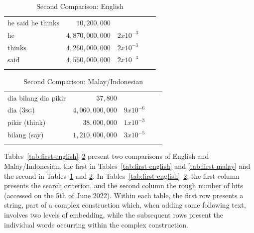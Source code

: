 \documentclass[output=paper,colorlinks,citecolor=brown
]{langscibook}
\begin{document}
\begin{table}
\caption{Second Comparison: English}
\label{tab:second-english}
 \begin{tabularx}{.8\textwidth}{X rrrr}
 \lsptoprule
 he said he thinks & $10,200,000$ & {} \\
 he & $4,870,000,000$ & $2 x 10^{-3}$ \\
 thinks & $4,260,000,000$ & $2 x 10^{-3}$\\
 said & $4,560,000,000$ & $2 x 10^{-3}$\\
 \lspbottomrule
 \end{tabularx}
\end{table}

\begin{table}
\caption{Second Comparison: Malay/Indonesian}
\label{tab:second-malay}
 \begin{tabularx}{.8\textwidth}{X rrrr}
 \lsptoprule
 dia bilang dia pikir & $37,800$ & {} \\
 dia (3\textsc{sg}) & $4,060,000,000$ & $9 x 10^{-6}$ \\
 pikir (think) & $38,000,000$ & $1 x 10^{-3}$\\
 bilang (say) & $1,210,000,000$ & $3 x 10^{-5}$\\
 \lspbottomrule
 \end{tabularx}
\end{table}

Tables~\ref{tab:first-english}--\ref{tab:second-malay} present two comparisons of English and Malay/Indonesian, the first in Tables~\ref{tab:first-english} and \ref{tab:first-malay} and the second in Tables~\ref{tab:second-english} and \ref{tab:second-malay}.  In Tables~\ref{tab:first-english}--\ref{tab:second-malay}, the first column presents the search criterion, and the second column the rough number of hits (accessed on the 5th of June 2022).  Within each table, the first row presents a string, part of a complex construction which, when adding some following text, involves two levels of embedding, while the subsequent rows present the individual words occurring within the complex construction.
\end{document}
